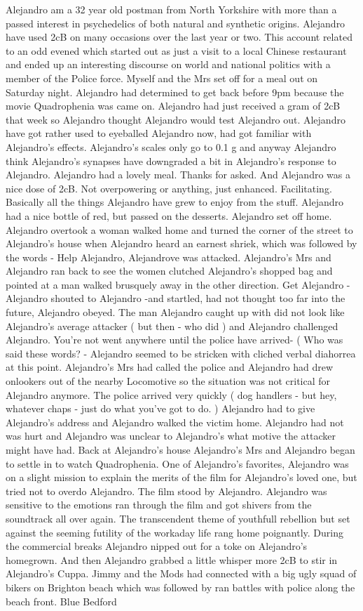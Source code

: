 \documentclass[12pt]{book}
\begin{document}
Alejandro am a 32 year old postman from North Yorkshire with more than a passed interest in psychedelics of both natural and synthetic origins. Alejandro have used 2cB on many occasions over the last year or two. This account related to an odd evened which started out as just a visit to a local Chinese restaurant and ended up an interesting discourse on world and national politics with a member of the Police force. Myself and the Mrs set off for a meal out on Saturday night. Alejandro had determined to get back before 9pm because the movie Quadrophenia was came on. Alejandro had just received a gram of 2cB that week so Alejandro thought Alejandro would test Alejandro out. Alejandro have got rather used to eyeballed Alejandro now, had got familiar with Alejandro's effects. Alejandro's scales only go to 0.1 g and anyway Alejandro think Alejandro's synapses have downgraded a bit in Alejandro's response to Alejandro. Alejandro had a lovely meal. Thanks for asked. And Alejandro was a nice dose of 2cB. Not overpowering or anything, just enhanced. Facilitating. Basically all the things Alejandro have grew to enjoy from the stuff. Alejandro had a nice bottle of red, but passed on the desserts. Alejandro set off home. Alejandro overtook a woman walked home and turned the corner of the street to Alejandro's house when Alejandro heard an earnest shriek, which was followed by the words - Help Alejandro, Alejandrove was attacked. Alejandro's Mrs and Alejandro ran back to see the women clutched Alejandro's shopped bag and pointed at a man walked brusquely away in the other direction. Get Alejandro - Alejandro shouted to Alejandro -and startled, had not thought too far into the future, Alejandro obeyed. The man Alejandro caught up with did not look like Alejandro's average attacker ( but then - who did ) and Alejandro challenged Alejandro. You're not went anywhere until the police have arrived- ( Who was said these words? - Alejandro seemed to be stricken with cliched verbal diahorrea at this point. Alejandro's Mrs had called the police and Alejandro had drew onlookers out of the nearby Locomotive so the situation was not critical for Alejandro anymore. The police arrived very quickly ( dog handlers - but hey, whatever chaps - just do what you've got to do. ) Alejandro had to give Alejandro's address and Alejandro walked the victim home. Alejandro had not was hurt and Alejandro was unclear to Alejandro's what motive the attacker might have had. Back at Alejandro's house Alejandro's Mrs and Alejandro began to settle in to watch Quadrophenia. One of Alejandro's favorites, Alejandro was on a slight mission to explain the merits of the film for Alejandro's loved one, but tried not to overdo Alejandro. The film stood by Alejandro. Alejandro was sensitive to the emotions ran through the film and got shivers from the soundtrack all over again. The transcendent theme of youthfull rebellion but set against the seeming futility of the workaday life rang home poignantly. During the commercial breaks Alejandro nipped out for a toke on Alejandro's homegrown. And then Alejandro grabbed a little whisper more 2cB to stir in Alejandro's Cuppa. Jimmy and the Mods had connected with a big ugly squad of bikers on Brighton beach which was followed by ran battles with police along the beach front. Blue Bedford 
\end{document}
